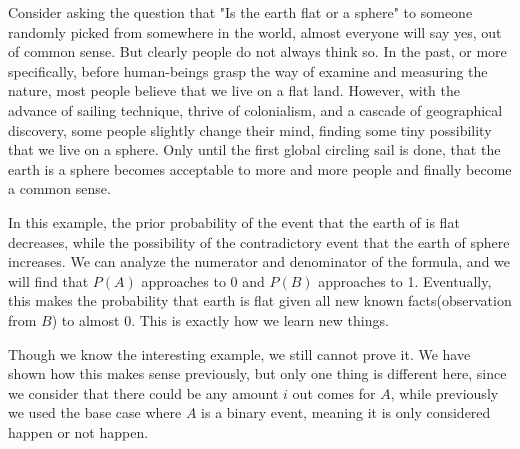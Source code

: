        Consider asking the question that "Is the earth flat or a sphere" to someone randomly picked from somewhere in the world, almost everyone will say yes, out of common sense. But clearly people do not always think so.
       In the past, or more specifically, before human-beings grasp the way of examine and measuring the nature, most people believe that we live on a flat land. However, with the advance of sailing technique, thrive of colonialism, and a cascade of geographical discovery, some people slightly change their mind, finding some tiny possibility that we live on a sphere. Only until the first global circling sail is done, that the earth is a sphere becomes acceptable to more and more people and finally become a common sense.
       
       In this example, the prior probability of the event that the earth of is flat decreases, while the possibility of the contradictory event that the earth of sphere increases. We can analyze the numerator and denominator of the formula, and we will find that  $P(A)$ approaches to 0 and
       $P(B)$ approaches to 1. Eventually, this makes the probability that earth is flat given all new known facts(observation from $B$) to almost 0. This is exactly how we learn new things.
       
       Though we know the interesting example, we still cannot prove it. We have shown how this makes sense previously, but only one thing is different here, since we consider that there could be any amount $i$ out comes for $A$, while previously we used the base case where $A$ is a binary event, meaning it is only considered happen or not happen.
       
